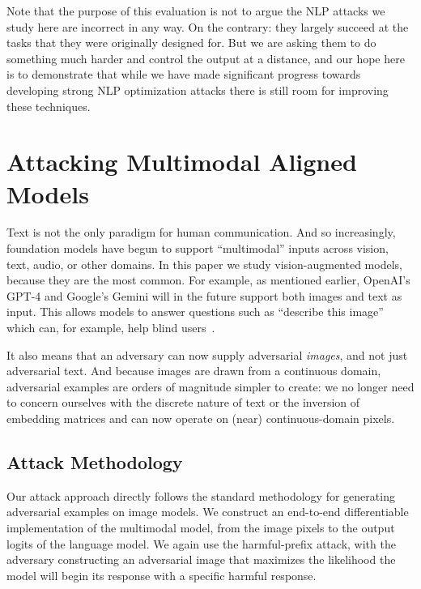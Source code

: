 \documentclass{article}
\renewcommand{\cite}{\citep}
\begin{document}
%

Note that the purpose of this evaluation is not to argue the NLP attacks we study here are
incorrect in any way.
%
On the contrary: they largely succeed at the tasks that they were originally designed for.
%
But we are asking them to do something much harder and control the output at a distance,
and our hope here is to
demonstrate that while we have made significant progress towards developing
strong NLP optimization attacks there is still room for improving these techniques.



\section{Attacking Multimodal Aligned Models}

Text is not the only paradigm for human communication.
%
And so increasingly, foundation models have begun to support ``multimodal'' inputs
across vision, text, audio, or other domains.
%
In this paper we study vision-augmented models,
because they are the most common.
%
For example, as mentioned earlier, OpenAI's GPT-4 and Google's Gemini will in the
future support both images and text as input.
%
This allows models to answer questions such as ``describe this image''
which can, for example, help blind users~\cite{bemyeyes}.

It also means that an adversary can now supply adversarial \emph{images}, 
and not just adversarial text.
%
And because images are drawn from a continuous domain, 
adversarial examples are orders of magnitude simpler to create:
we no longer need to concern ourselves with the discrete nature of text
or the inversion of embedding matrices and can now operate on (near) continuous-domain
pixels.%

\subsection{Attack Methodology}

Our attack approach directly follows the standard methodology for generating
adversarial examples on image models.
%
We construct an end-to-end differentiable implementation of the multimodal model,
from the image pixels to the output logits of the language model.
%
We again use the harmful-prefix attack, with the adversary constructing an
adversarial image that maximizes the likelihood the model will begin its
response with a specific harmful response.
\end{document}
